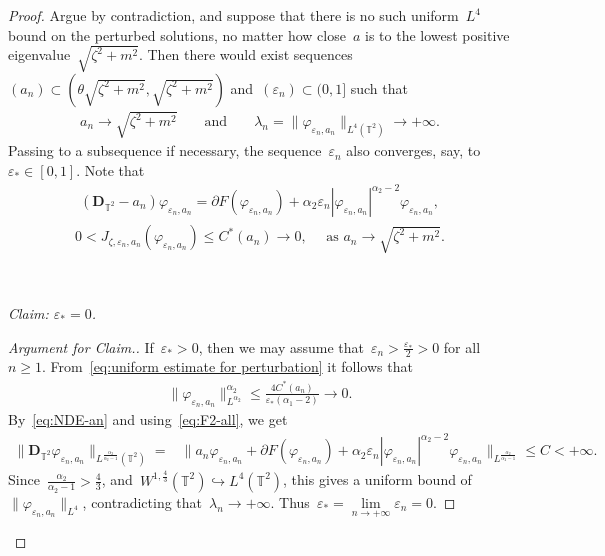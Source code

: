 \documentclass[11pt,final]{amsart}
\newcommand{\p}{\partial}
\newcommand{\T}{\mathbb{T}}
\newcommand{\eps}{\varepsilon}
\newcommand{\pD}{\mathbf{D}}
\begin{document}
\begin{proof}
Argue by contradiction, and suppose that there is no such uniform~$L^4$ bound on the perturbed solutions, no matter how close~$a$ is to the lowest positive eigenvalue~$\sqrt{\zeta^2+m^2}$. 
Then there would exist sequences~$(a_n)\subset (\theta\sqrt{\zeta^2+m^2},\sqrt{\zeta^2+m^2})$ and~$(\eps_n)\subset (0,1]$ such that
\begin{align}
    a_n\to\sqrt{\zeta^2+m^2}
    & & \mbox{ and } & &
    \lambda_n=\|\varphi_{\eps_n,a_n}\|_{L^4(\T^2)}\to+\infty. 
\end{align}
Passing to a subsequence if necessary, the sequence~$\eps_n$ also converges, say, to~$\eps_*\in [0,1]$. 
Note that 
\begin{align}\label{eq:NDE-an}
    (\pD_{\T^2} -a_n) \varphi_{\eps_n,a_n} 
    = \p F(\varphi_{\eps_n,a_n}) 
    + \alpha_2 \eps_n |\varphi_{\eps_n,a_n}|^{\alpha_2 -2} \varphi_{\eps_n,a_n}, 
\end{align}
\begin{align}
    0<J_{\zeta,\eps_n,a_n} (\varphi_{\eps_n,a_n})  \leq C^*(a_n) \to 0, \quad \mbox{ as } a_n \to \sqrt{\zeta^2+m^2}. 
\end{align}

\ 

\emph{Claim: $\eps_*=0$.}
\begin{proof}[Argument for Claim.] If~$\eps_*>0$, then we may assume that~$\eps_n>\frac{\eps_*}{2}>0$ for all~$n\geq 1$. 
    From~\eqref{eq:uniform estimate for perturbation} it follows that
    \begin{align}
        \|\varphi_{\eps_n,a_n}\|_{L^{\alpha_2}}^{\alpha_2} \leq \frac{4C^*(a_n)}{\eps_*(\alpha_1 -2)} \to 0.
    \end{align}
    By~\eqref{eq:NDE-an} and using~\eqref{eq:F2-all}, we get 
    \begin{align}
        \|\pD_{\T^2} \varphi_{\eps_n,a_n}\|_{L^{\frac{\alpha_2}{\alpha_2 -1}}(\T^2)}
        =& \| a_n \varphi_{\eps_n,a_n} +\p F(\varphi_{\eps_n,a_n}) 
    + \alpha_2 \eps_n |\varphi_{\eps_n,a_n}|^{\alpha_2 -2} \varphi_{\eps_n,a_n} \|_{L^{\frac{\alpha_2}{\alpha_2-1}}} \leq C<+\infty. 
    \end{align}
    Since~$\frac{\alpha_2}{\alpha_2 -1}>\frac{4}{3}$, and~$W^{1,\frac{4}{3}}(\T^2)\hookrightarrow L^4(\T^2)$, this gives a uniform bound of~$\|\varphi_{\eps_n,a_n}\|_{L^4}$, contradicting that~$\lambda_n\to+\infty$.
    Thus~$\eps_* =\lim\limits_{n\to+\infty} \eps_n =0$. 
\end{proof}



\end{proof}
\end{document}
